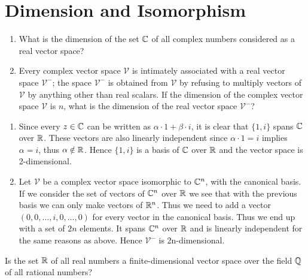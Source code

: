 \section{Dimension and Isomorphism}

\begin{problem}
  \begin{enumerate}[label=(\alph*)]
    \item What is the dimension of the set $\mathbb{C}$ of all complex numbers considered as a real vector space?
    \item Every complex vector space $\mathcal{V}$ is intimately associated with a real vector space $\mathcal{V}^-$; 
      the space $\mathcal{V}^-$ is obtained from $\mathcal{V}$ by refusing to multiply vectors of $\mathcal{V}$ by anything other than real scalars.
      If the dimension of the complex vector space $\mathcal{V}$ is $n$, what is the dimension of the real vector space $\mathcal{V}^-$?
  \end{enumerate}
\end{problem}

\begin{solution}
  \begin{enumerate}[label=(\alph*)]
    \item Since every $z \in \mathbb{C}$ can be written as $\alpha \cdot 1 + \beta \cdot i$, it is clear that $\{1, i\}$ spans $\mathbb{C}$ over $\mathbb{R}$.
      These vectors are also linearly independent since $\alpha \cdot 1 = i$ implies $\alpha = i$, thus $\alpha \notin \mathbb{R}$.
      Hence $\{1, i\}$ is a basis of $\mathbb{C}$ over $\mathbb{R}$ and the vector space is 2-dimensional.
    \item Let $\mathcal{V}$ be a complex vector space isomorphic to $\mathbb{C}^n$, with the canonical basis.
      If we consider the set of vectors of $\mathbb{C}^n$ over $\mathbb{R}$ we see that with the previous basis we can only make vectors of $\mathbb{R}^n$.
      Thus we need to add a vector $(0, 0, \ldots, i, 0, \ldots, 0)$ for every vector in the canonical basis.
      Thus we end up with a set of $2n$ elements.
      It spans $\mathbb{C}^n$ over $\mathbb{R}$ and is linearly independent for the same reasons as above.
      Hence $\mathcal{V}^-$ is 2n-dimensional.
  \end{enumerate}
\end{solution}

\begin{problem}
  Is the set $\mathbb{R}$ of all real numbers a finite-dimensional vector space over the field $\mathbb{Q}$ of all rational numbers?
\end{problem}

